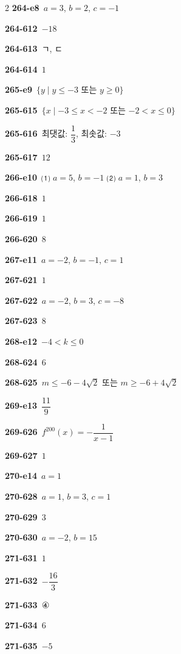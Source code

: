 \documentclass[10pt,a4paper]{article}
\begin{document}
\begin{multicols}{2}
\noindent\textbf{264-e8}\ $a=3$, $b=2$, $c=-1$\par
\noindent\textbf{264-612}\ $-18$\par
\noindent\textbf{264-613}\ ㄱ, ㄷ\par
\noindent\textbf{264-614}\ $1$\par
\noindent\textbf{265-e9}\ $\{y \mid y\le -3$ 또는 $y\ge 0\}$\par
\noindent\textbf{265-615}\ $\{x \mid -3\le x<-2$ 또는 $-2<x\le 0\}$\par
\noindent\textbf{265-616}\ 최댓값: $\dfrac{1}{3}$, 최솟값: $-3$\par
\noindent\textbf{265-617}\ $12$\par
\noindent\textbf{266-e10}\ ⑴ $a=5$, $b=-1$ ⑵ $a=1$, $b=3$\par
\noindent\textbf{266-618}\ $1$\par
\noindent\textbf{266-619}\ $1$\par
\noindent\textbf{266-620}\ $8$\par
\noindent\textbf{267-e11}\ $a=-2$, $b=-1$, $c=1$\par
\noindent\textbf{267-621}\ $1$\par
\noindent\textbf{267-622}\ $a=-2$, $b=3$, $c=-8$\par
\noindent\textbf{267-623}\ $8$\par
\noindent\textbf{268-e12}\ $-4<k\le 0$\par
\noindent\textbf{268-624}\ $6$\par
\noindent\textbf{268-625}\ $m\le -6-4\sqrt{2}$ 또는 $m\ge -6+4\sqrt{2}$\par
\noindent\textbf{269-e13}\ $\dfrac{11}{9}$\par
\noindent\textbf{269-626}\ $f^{200}(x)=-\dfrac{1}{x-1}$\par
\noindent\textbf{269-627}\ $1$\par
\noindent\textbf{270-e14}\ $a=1$\par
\noindent\textbf{270-628}\ $a=1$, $b=3$, $c=1$\par
\noindent\textbf{270-629}\ $3$\par
\noindent\textbf{270-630}\ $a=-2$, $b=15$\par
\noindent\textbf{271-631}\ $1$\par
\noindent\textbf{271-632}\ $-\dfrac{16}{3}$\par
\noindent\textbf{271-633}\ ④\par
\noindent\textbf{271-634}\ $6$\par
\noindent\textbf{271-635}\ $-5$\par

\end{multicols}
\end{document}
